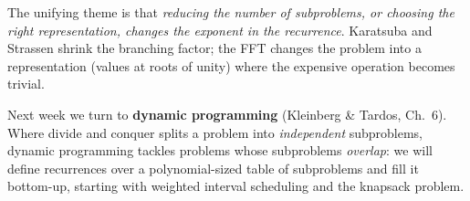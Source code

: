 \documentclass[11pt]{article}
\begin{document}
The unifying theme is that \emph{reducing the number of subproblems, or choosing the right
representation, changes the exponent in the recurrence}. Karatsuba and Strassen shrink the
branching factor; the FFT changes the problem into a representation (values at roots of
unity) where the expensive operation becomes trivial.

Next week we turn to \textbf{dynamic programming} (Kleinberg \& Tardos, Ch.~6). Where divide
and conquer splits a problem into \emph{independent} subproblems, dynamic programming tackles
problems whose subproblems \emph{overlap}: we will define recurrences over a polynomial-sized
table of subproblems and fill it bottom-up, starting with weighted interval scheduling and
the knapsack problem.
\end{document}

